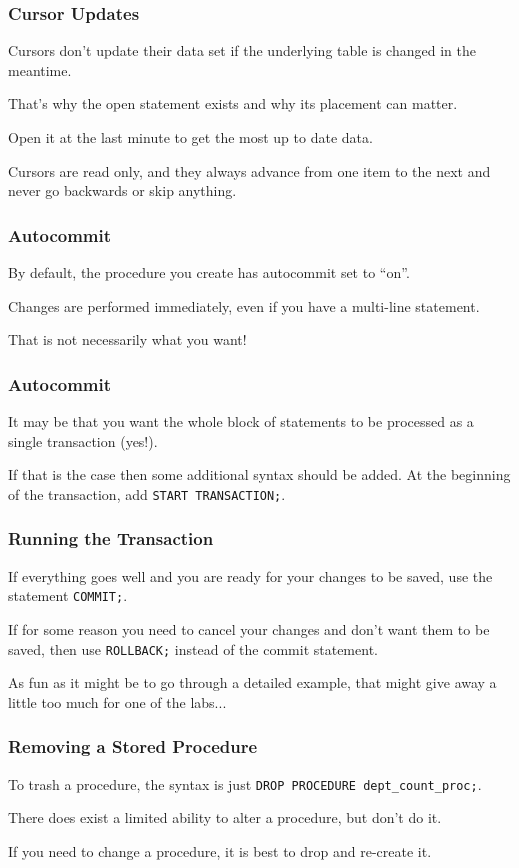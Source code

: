 \begin{frame}
\frametitle{Cursor Updates}

Cursors don't update their data set if the underlying table is changed in the meantime. 

That's why the open statement exists and why its placement can matter. 

Open it at the last minute to get the most up to date data. 

Cursors are read only, and they always advance from one item to the next and never go backwards or skip anything.

\end{frame}

\begin{frame}
\frametitle{Autocommit}

By default, the procedure you create has autocommit set to ``on''.

Changes are performed immediately, even if you have a multi-line statement.

That is not necessarily what you want! 

\end{frame}

\begin{frame}
\frametitle{Autocommit}


It may be that you want the whole block of statements to be processed as a single transaction (yes!). 

If that is the case then some additional syntax should be added. At the beginning of the transaction, add \texttt{START TRANSACTION;}.


\end{frame}

\begin{frame}
\frametitle{Running the Transaction}

If everything goes well and you are ready for your changes to be saved, use the statement \texttt{COMMIT;}. 

If for some reason you need to cancel your changes and don't want them to be saved, then use \texttt{ROLLBACK;} instead of the commit statement. 

As fun as it might be to go through a detailed example, that might give away a little too much for one of the labs...

\end{frame}

\begin{frame}
\frametitle{Removing a Stored Procedure}

To trash a procedure, the syntax is just \texttt{DROP PROCEDURE dept\_count\_proc;}. 

There does exist a limited ability to alter a procedure, but don't do it. 

If you need to change a procedure, it is best to drop and re-create it.

\end{frame}

